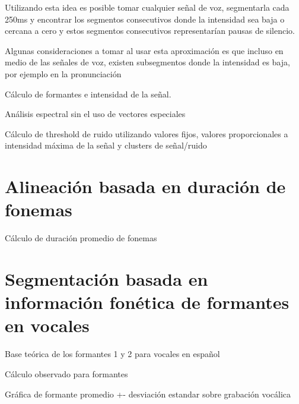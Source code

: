 \documentclass[a4paper,12pt,twoside]{report}
\begin{document}
Utilizando esta idea es posible tomar cualquier señal de voz, segmentarla cada 250ms y encontrar los segmentos consecutivos donde la intensidad sea baja o cercana a cero y estos segmentos consecutivos representarían pausas de silencio.

Algunas consideraciones a tomar al usar esta aproximación es que incluso en medio de las señales de voz, existen subsegmentos donde la intensidad es baja, por ejemplo en la pronunciación 



Cálculo de formantes e intensidad de la señal.

Análisis espectral sin el uso de vectores especiales

Cálculo de threshold de ruido utilizando valores fijos, valores proporcionales a intensidad máxima de la señal y clusters de señal/ruido

\section{Alineación basada en duración de fonemas}

Cálculo de duración promedio de fonemas



\section{Segmentación basada en información fonética de formantes en vocales}

Base teórica de los formantes 1 y 2 para vocales en español

Cálculo observado para formantes 

Gráfica de formante promedio +- desviación estandar sobre grabación vocálica


% 
% 

\end{document}
